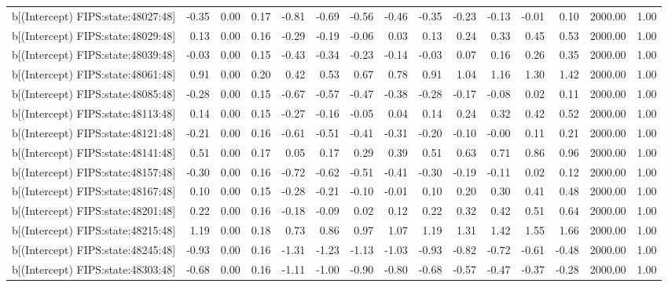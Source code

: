 \begin{table}[ht]
\begin{tabular}{rrrrrrrrrrrrrrr}
  b[(Intercept) FIPS:state:48027:48] & -0.35 & 0.00 & 0.17 & -0.81 & -0.69 & -0.56 & -0.46 & -0.35 & -0.23 & -0.13 & -0.01 & 0.10 & 2000.00 & 1.00 \\ 
  b[(Intercept) FIPS:state:48029:48] & 0.13 & 0.00 & 0.16 & -0.29 & -0.19 & -0.06 & 0.03 & 0.13 & 0.24 & 0.33 & 0.45 & 0.53 & 2000.00 & 1.00 \\ 
  b[(Intercept) FIPS:state:48039:48] & -0.03 & 0.00 & 0.15 & -0.43 & -0.34 & -0.23 & -0.14 & -0.03 & 0.07 & 0.16 & 0.26 & 0.35 & 2000.00 & 1.00 \\ 
  b[(Intercept) FIPS:state:48061:48] & 0.91 & 0.00 & 0.20 & 0.42 & 0.53 & 0.67 & 0.78 & 0.91 & 1.04 & 1.16 & 1.30 & 1.42 & 2000.00 & 1.00 \\ 
  b[(Intercept) FIPS:state:48085:48] & -0.28 & 0.00 & 0.15 & -0.67 & -0.57 & -0.47 & -0.38 & -0.28 & -0.17 & -0.08 & 0.02 & 0.11 & 2000.00 & 1.00 \\ 
  b[(Intercept) FIPS:state:48113:48] & 0.14 & 0.00 & 0.15 & -0.27 & -0.16 & -0.05 & 0.04 & 0.14 & 0.24 & 0.32 & 0.42 & 0.52 & 2000.00 & 1.00 \\ 
  b[(Intercept) FIPS:state:48121:48] & -0.21 & 0.00 & 0.16 & -0.61 & -0.51 & -0.41 & -0.31 & -0.20 & -0.10 & -0.00 & 0.11 & 0.21 & 2000.00 & 1.00 \\ 
  b[(Intercept) FIPS:state:48141:48] & 0.51 & 0.00 & 0.17 & 0.05 & 0.17 & 0.29 & 0.39 & 0.51 & 0.63 & 0.71 & 0.86 & 0.96 & 2000.00 & 1.00 \\ 
  b[(Intercept) FIPS:state:48157:48] & -0.30 & 0.00 & 0.16 & -0.72 & -0.62 & -0.51 & -0.41 & -0.30 & -0.19 & -0.11 & 0.02 & 0.12 & 2000.00 & 1.00 \\ 
  b[(Intercept) FIPS:state:48167:48] & 0.10 & 0.00 & 0.15 & -0.28 & -0.21 & -0.10 & -0.01 & 0.10 & 0.20 & 0.30 & 0.41 & 0.48 & 2000.00 & 1.00 \\ 
  b[(Intercept) FIPS:state:48201:48] & 0.22 & 0.00 & 0.16 & -0.18 & -0.09 & 0.02 & 0.12 & 0.22 & 0.32 & 0.42 & 0.51 & 0.64 & 2000.00 & 1.00 \\ 
  b[(Intercept) FIPS:state:48215:48] & 1.19 & 0.00 & 0.18 & 0.73 & 0.86 & 0.97 & 1.07 & 1.19 & 1.31 & 1.42 & 1.55 & 1.66 & 2000.00 & 1.00 \\ 
  b[(Intercept) FIPS:state:48245:48] & -0.93 & 0.00 & 0.16 & -1.31 & -1.23 & -1.13 & -1.03 & -0.93 & -0.82 & -0.72 & -0.61 & -0.48 & 2000.00 & 1.00 \\ 
  b[(Intercept) FIPS:state:48303:48] & -0.68 & 0.00 & 0.16 & -1.11 & -1.00 & -0.90 & -0.80 & -0.68 & -0.57 & -0.47 & -0.37 & -0.28 & 2000.00 & 1.00 \\ 

\end{tabular}
\end{table}
